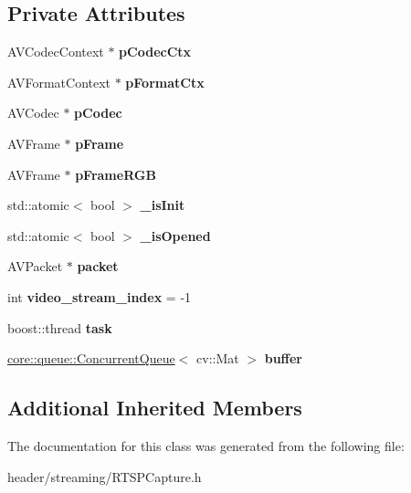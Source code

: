 \subsection*{Private Attributes}
\begin{DoxyCompactItemize}
\item 
\mbox{\label{class_r_t_s_p_capture_a4acd01e1b34d03a1a0ec1bb966a2cab8}} 
A\+V\+Codec\+Context $\ast$ {\bfseries p\+Codec\+Ctx}
\item 
\mbox{\label{class_r_t_s_p_capture_a0081c9c497f510251373766361ed4268}} 
A\+V\+Format\+Context $\ast$ {\bfseries p\+Format\+Ctx}
\item 
\mbox{\label{class_r_t_s_p_capture_a9f7ca9971ac0efc866cf6f46bd52885f}} 
A\+V\+Codec $\ast$ {\bfseries p\+Codec}
\item 
\mbox{\label{class_r_t_s_p_capture_a4198e111ed3d3dfe682a3b15fbea4daa}} 
A\+V\+Frame $\ast$ {\bfseries p\+Frame}
\item 
\mbox{\label{class_r_t_s_p_capture_a5ea382970da5474704af4ad22ce4f806}} 
A\+V\+Frame $\ast$ {\bfseries p\+Frame\+R\+GB}
\item 
\mbox{\label{class_r_t_s_p_capture_a06327c550689e9ae484d35df698d0342}} 
std\+::atomic$<$ bool $>$ {\bfseries \+\_\+is\+Init}
\item 
\mbox{\label{class_r_t_s_p_capture_ae8fd5748e191696aaaaa8c367e6d5b1b}} 
std\+::atomic$<$ bool $>$ {\bfseries \+\_\+is\+Opened}
\item 
\mbox{\label{class_r_t_s_p_capture_a4b883b4bcaa00e8689f6490124c92ab0}} 
A\+V\+Packet $\ast$ {\bfseries packet}
\item 
\mbox{\label{class_r_t_s_p_capture_a4fdc751be15aa45317dbe64e9402106d}} 
int {\bfseries video\+\_\+stream\+\_\+index} = -\/1
\item 
\mbox{\label{class_r_t_s_p_capture_a7af0a24697659fd67a84d4c4e3b3e096}} 
boost\+::thread {\bfseries task}
\item 
\mbox{\label{class_r_t_s_p_capture_a10ded452bb64ce44822565d00dcb3a4f}} 
\hyperlink{classcore_1_1queue_1_1_concurrent_queue}{core\+::queue\+::\+Concurrent\+Queue}$<$ cv\+::\+Mat $>$ {\bfseries buffer}
\end{DoxyCompactItemize}
\subsection*{Additional Inherited Members}


The documentation for this class was generated from the following file\+:\begin{DoxyCompactItemize}
\item 
header/streaming/R\+T\+S\+P\+Capture.\+h\end{DoxyCompactItemize}
